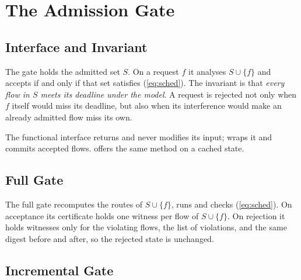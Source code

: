 \documentclass[9pt,a4paper,twocolumn,twoside]{tau-class/tau}
\newcommand{\src}[1]{../../src/tsn_gate/#1}
\providecommand{\eqref}[1]{(\ref{#1})}
\begin{document}
        \begin{code}
            }
            \caption{TFA pass, burst propagation \eqref{eq:burst} and end-to-end bound \eqref{eq:e2e}.}
            \label{lst:tfa}
        \end{code}


\section{The Admission Gate}

    \subsection{Interface and Invariant}

        The gate holds the admitted set $S$. On a request $f$ it analyses $S \cup \{f\}$ and accepts if and only if that set satisfies \eqref{eq:sched}. The invariant is that \emph{every flow in $S$ meets its deadline under the model}. A request is rejected not only when $f$ itself would miss its deadline, but also when its interference would make an already admitted flow miss its own.

        The functional interface  returns  and never modifies its input;  wraps it and commits accepted flows.  offers the same  method on a cached state.

    \subsection{Full Gate}

        The full gate recomputes the routes of $S \cup \{f\}$, runs  and checks \eqref{eq:sched}. On acceptance its certificate holds one witness per flow of $S \cup \{f\}$. On rejection it holds witnesses only for the violating flows, the list of violations, and the same digest before and after, so the rejected state is unchanged.

    \subsection{Incremental Gate}
    \label{sec:incr}
\end{document}
